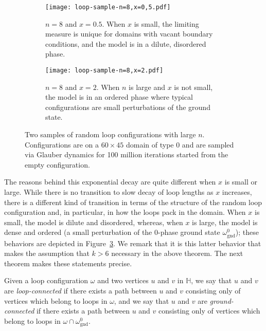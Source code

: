 \documentclass[12pt,reqno]{article}
\newcommand{\HH}{\mathbb{H}}
\newcommand{\ground}{\omega_{\operatorname{gnd}}}
\begin{document}
\begin{figure}[t!]
   \centering
   \begin{subfigure}[t]{.5\textwidth}
       \texttt{[image: loop-sample-n=8,x=0,5.pdf]}
       \caption{$n=8$ and $x=0.5$. When $x$ is small, the limiting measure is unique for domains with vacant boundary conditions, and the model is in a dilute, disordered phase.}
       \label{fig:loop-sample-n=8,x=0.5}
   \end{subfigure}%
   \begin{subfigure}{20pt}
       \quad
   \end{subfigure}%
   \begin{subfigure}[t]{.5\textwidth}
       \texttt{[image: loop-sample-n=8,x=2.pdf]}
       \caption{$n=8$ and $x=2$. When $n$ is large and $x$ is not small, the model is in an ordered phase where typical configurations are small perturbations of the ground state.}
       \label{fig:loop-sample-n=8,x=2}
   \end{subfigure}
   \caption{Two samples of random loop configurations with large $n$. Configurations are on a $60\times45$ domain of type $0$ and are sampled via Glauber dynamics for 100 million iterations started from the empty configuration.}
   \label{fig:loop-samples-large-n}
\end{figure}

The reasons behind this exponential decay are quite different when $x$ is small or large. While there is no transition to slow decay of loop lengths as $x$ increases, there is a different kind of transition in terms of the structure of the random loop configuration and, in particular, in how the loops pack in the domain.
When $x$ is small, the model is dilute and disordered, whereas, when $x$ is large, the model is dense and ordered (a small perturbation of the $0$-phase ground state $\ground^0$); these behaviors are depicted in Figure~\ref{fig:loop-samples-large-n}.
We remark that it is this latter behavior that makes the assumption that $k>6$ necessary in the above theorem. The next theorem makes these statements precise.


Given a loop configuration $\omega$ and two vertices $u$ and $v$ in $\HH$, we say that $u$ and $v$ are \emph{loop-connected} if there exists a path between $u$ and $v$ consisting only of vertices which belong to loops in $\omega$, and we say that $u$ and $v$ are \emph{ground-connected} if there exists a path between $u$ and $v$ consisting only of vertices which belong to loops in $\omega \cap \ground^0$.
\end{document}
